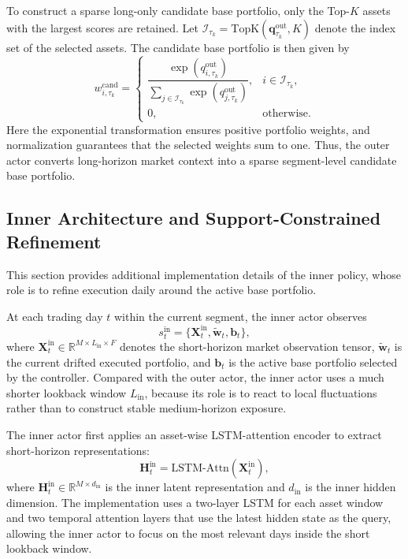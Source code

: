 \documentclass[letterpaper]{article} %
\begin{document}
To construct a sparse long-only candidate base portfolio, only the Top-\(K\) assets with the largest scores are retained. Let \(\mathcal{I}_{\tau_k}=\mathrm{TopK}(\mathbf{q}^{\mathrm{out}}_{\tau_k},K)\) denote the index set of the selected assets. The candidate base portfolio is then given by
\[
w_{i,\tau_k}^{\mathrm{cand}}
=
\begin{cases}
\dfrac{\exp(q_{i,\tau_k}^{\mathrm{out}})}
{\sum_{j\in\mathcal{I}_{\tau_k}}
\exp(q_{j,\tau_k}^{\mathrm{out}})},
& i\in\mathcal{I}_{\tau_k},\\[10pt]
0, & \text{otherwise}.
\end{cases}
\]
Here the exponential transformation ensures positive portfolio weights, and normalization guarantees that the selected weights sum to one. Thus, the outer actor converts long-horizon market context into a sparse segment-level candidate base portfolio.

\subsection{Inner Architecture and Support-Constrained Refinement}
\label{app:hier_inner}

This section provides additional implementation details of the inner policy, whose role is to refine execution daily around the active base portfolio.

At each trading day \(t\) within the current segment, the inner actor observes
\[
s_t^{\mathrm{in}}
=
\bigl\{\mathbf{X}^{\mathrm{in}}_t,\tilde{\mathbf{w}}_t,\mathbf{b}_t\bigr\},
\]
where \(\mathbf{X}^{\mathrm{in}}_t\in\mathbb{R}^{M\times L_{\mathrm{in}}\times F}\) denotes the short-horizon market observation tensor, \(\tilde{\mathbf{w}}_t\) is the current drifted executed portfolio, and \(\mathbf{b}_t\) is the active base portfolio selected by the controller. Compared with the outer actor, the inner actor uses a much shorter lookback window \(L_{\mathrm{in}}\), because its role is to react to local fluctuations rather than to construct stable medium-horizon exposure.

The inner actor first applies an asset-wise LSTM-attention encoder to extract short-horizon representations:
\[
\mathbf{H}^{\mathrm{in}}_t
=
\mathrm{LSTM\mbox{-}Attn}\!\left(\mathbf{X}^{\mathrm{in}}_t\right),
\]
where \(\mathbf{H}^{\mathrm{in}}_t\in\mathbb{R}^{M\times d_{\mathrm{in}}}\) is the inner latent representation and \(d_{\mathrm{in}}\) is the inner hidden dimension. The implementation uses a two-layer LSTM for each asset window and two temporal attention layers that use the latest hidden state as the query, allowing the inner actor to focus on the most relevant days inside the short lookback window.
\end{document}
